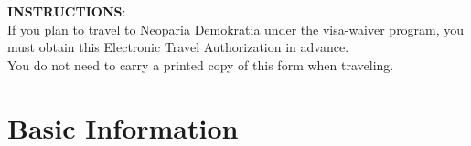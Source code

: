 




\begin{minipage}{\textwidth}
	\small
	\textbf{INSTRUCTIONS}:
	\\\inlinelistitem If you plan to travel to Neoparia Demokratia under the visa-waiver program, you must obtain this Electronic Travel Authorization in advance.
	\\\inlinelistitem You do not need to carry a printed copy of this form when traveling.
\end{minipage}
\vskip 10pt


\formbrickcontentheight=36pt
\formbrickpaddingtop=6pt


\section*{Basic Information}

